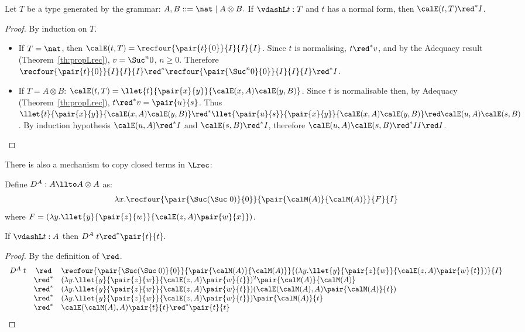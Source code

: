 \documentclass{article}
\begin{document}
\begin{theorem}
Let $T$ be a type generated by the grammar:
\(
A,B ::= \nat \mid A \otimes B.
\)
If $\vdashL t :T$ and $t$ has a normal form, then $\calE(t,T)\red^* I$.
\end{theorem}
\begin{proof} 
By induction on $T$. 
\begin{itemize}
\item If $T=\nat$, then $\calE(t,T) = \recfour{\pair{t}{0}}{I}{I}{I}$. Since $t$ is normalising, $t\red^* v$, and by the Adequacy result (Theorem~\ref{th:propLrec}), $v=\Suc^n 0$, $n \ge 0$. Therefore $\recfour{\pair{t}{0}}{I}{I}{I} \red^*  \recfour{\pair{\Suc^n 0}{0}}{I}{I}{I} \red^* I$.
\item  If 
 $T=A\otimes B$:  $\calE(t,T) =
\llet{t}{\pair{x}{y}}{\calE(x,A)\calE(y,B)}$. Since $t$ is
normalisable then,  by Adequacy
(Theorem~\ref{th:propLrec}), $t\red^* v=\pair{u}{s}$. Thus
$\llet{t}{\pair{x}{y}}{\calE(x,A)\calE(y,B)} \red^*
\llet{\pair{u}{s}}{\pair{x}{y}}{\calE(x,A)\calE(y,B)} \red
\calE(u,A)\calE(s,B)$. By induction hypothesis $\calE(u,A) \red^* I$ and $\calE(s,B) \red^* I$, therefore $\calE(u,A)\calE(s,B)\red^* II \red I$.
\end{itemize}
\end{proof}
There is also a mechanism to copy closed terms in $\Lrec$:
\begin{definition}[Duplication]
\label{def:duplication-in-Lrec}
Define $D^A : A \llto A\otimes A$ as:
\[
\lambda x.\recfour{\pair{\Suc(\Suc\;0)}{0}}{\pair{\calM(A)}{{\calM(A)}}}
{F}{I}
\]
where $F = (\lambda y.\llet{y}{\pair{z}{w}}{\calE(z,A)\pair{w}{x}})$.
\end{definition}

\begin{theorem}
\label{th:dupl}
If $\vdashL t:A$ then $D^A\; t \red^* \pair{t}{t}.$
\end{theorem}
\begin{proof}
By the definition of $\red$.
\[
\begin{array}{lcl}
 D^A\; t& \red & \recfour{\pair{\Suc(\Suc\;0)}{0}}{\pair{\calM(A)}{{\calM(A)}}}
{(\lambda y.\llet{y}{\pair{z}{w}}{\calE(z,A)\pair{w}{t}})}{I}  \\
& \red^* &
(\lambda y.\llet{y}{\pair{z}{w}}{\calE(z,A)\pair{w}{t}})^2 \pair{\calM(A)}{{\calM(A)}}\\
& \red^* &
(\lambda y.\llet{y}{\pair{z}{w}}{\calE(z,A)\pair{w}{t}}) (\calE(\calM(A),A)\pair{\calM(A)}{t})\\
& \red^* &
(\lambda y.\llet{y}{\pair{z}{w}}{\calE(z,A)\pair{w}{t}})\pair{\calM(A)}{t}\\
& \red^* & \calE(\calM(A),A)\pair{t}{t} \red^* \pair{t}{t} 
\end{array}
\]
\end{proof}
\end{document}
